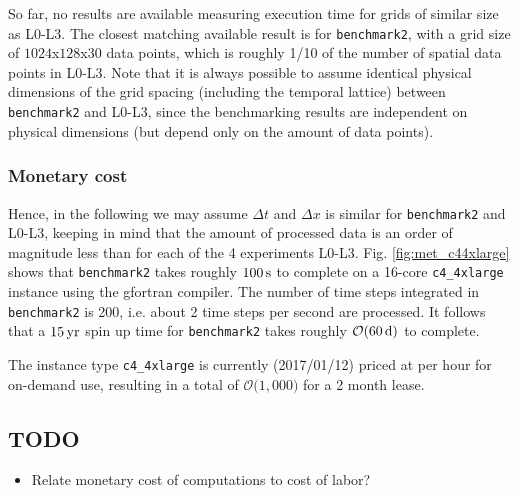 \documentclass[12pt,a4paper]{article}
\begin{document}
So far, no results are available measuring execution time for grids of similar size as L0-L3. The closest matching available result is for \verb|benchmark2|, with a grid size of $1024$x$128$x$30$ data points, which is roughly 1/10 of the number of spatial data points in L0-L3. Note that it is always possible to assume identical physical dimensions of the grid spacing (including the temporal lattice) between \verb|benchmark2| and L0-L3, since the benchmarking results are independent on physical dimensions (but depend only on the amount of data points).


\subsubsection{Monetary cost}

Hence, in the following we may assume $\Delta t$ and $\Delta x$ is similar for \verb|benchmark2| and L0-L3, keeping in mind that the amount of processed data is an order of magnitude less than for each of the 4 experiments L0-L3.
Fig. \ref{fig:met_c44xlarge} shows that \verb|benchmark2| takes roughly $100\,\rm s$ to complete on a 16-core \verb|c4_4xlarge| instance using the gfortran compiler. The number of time steps integrated in  \verb|benchmark2| is 200, i.e. about 2 time steps per second are processed. It follows that a $15\,\rm yr$ spin up time for \verb|benchmark2| takes roughly $\mathcal{O}(60\,\rm d)$ to complete.

The instance type \verb|c4_4xlarge| is currently (2017/01/12) priced at  per hour for on-demand use, resulting in a total of $\mathcal{O}($\textdollar $1,000) $ for a 2 month lease.


\subsection{TODO}

\begin{itemize}
	\item Relate monetary cost of computations to cost of labor?
\end{itemize}

	


\end{document}
